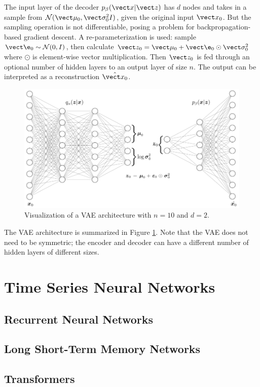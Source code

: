 The input layer of the decoder $p_\beta(\vect x | \vect z)$ has $d$ nodes and takes in a sample from $\mathcal{N}(\vect \mu_0, \vect \sigma_0^2I)$, given the original input $\vect x_0$. But the sampling operation is not differentiable, posing a problem for backpropagation-based gradient descent. A re-parameterization is used: sample $\vect \e_0 \sim \mathcal{N}(0,I)$, then calculate $\vect z_0 = \vect \mu_0 + \vect \e_0 \odot \vect \sigma_0^2$ where $\odot$ is element-wise vector multiplication. Then $\vect z_0$ is fed through an optional number of hidden layers to an output layer of size $n$. The output can be interpreted as a reconstruction $\hat{\vect x_0}$.

\begin{figure}[h]
  \centering
  \includegraphics[width=.95\textwidth]{img/vae_visual.png}
  \caption{Visualization of a VAE architecture with $n=10$ and $d=2$.}
  \label{fig:vae_visual}
\end{figure}
The VAE architecture is summarized in Figure \ref{fig:vae_visual}. Note that the VAE does not need to be symmetric; the encoder and decoder can have a different number of hidden layers of different sizes.

\section{Time Series Neural Networks}

\subsection{Recurrent Neural Networks}

\subsection{Long Short-Term Memory Networks}

\subsection{Transformers}
